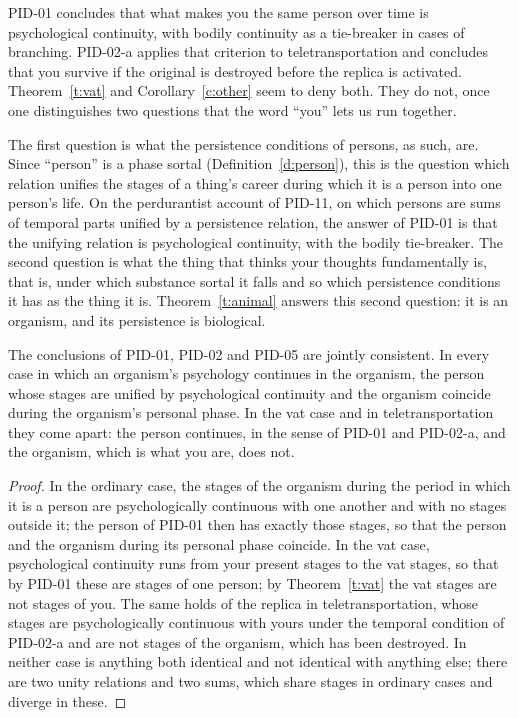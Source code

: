 \documentclass{situationist-preprint}
\begin{document}
PID-01 concludes that what makes you the same person over time is psychological continuity, with bodily continuity as a tie-breaker in cases of branching. PID-02-a applies that criterion to teletransportation and concludes that you survive if the original is destroyed before the replica is activated. Theorem~\ref{t:vat} and Corollary~\ref{c:other} seem to deny both. They do not, once one distinguishes two questions that the word \enquote{you} lets us run together.

The first question is what the persistence conditions of persons, as such, are. Since \enquote{person} is a phase sortal (Definition~\ref{d:person}), this is the question which relation unifies the stages of a thing's career during which it is a person into one person's life. On the perdurantist account of PID-11, on which persons are sums of temporal parts unified by a persistence relation, the answer of PID-01 is that the unifying relation is psychological continuity, with the bodily tie-breaker. The second question is what the thing that thinks your thoughts fundamentally is, that is, under which substance sortal it falls and so which persistence conditions it has as the thing it is. Theorem~\ref{t:animal} answers this second question: it is an organism, and its persistence is biological.

\begin{proposition}\label{p:recon}
The conclusions of PID-01, PID-02 and PID-05 are jointly consistent. In every case in which an organism's psychology continues in the organism, the person whose stages are unified by psychological continuity and the organism coincide during the organism's personal phase. In the vat case and in teletransportation they come apart: the person continues, in the sense of PID-01 and PID-02-a, and the organism, which is what you are, does not.
\end{proposition}

\begin{proof}
In the ordinary case, the stages of the organism during the period in which it is a person are psychologically continuous with one another and with no stages outside it; the person of PID-01 then has exactly those stages, so that the person and the organism during its personal phase coincide. In the vat case, psychological continuity runs from your present stages to the vat stages, so that by PID-01 these are stages of one person; by Theorem~\ref{t:vat} the vat stages are not stages of you. The same holds of the replica in teletransportation, whose stages are psychologically continuous with yours under the temporal condition of PID-02-a and are not stages of the organism, which has been destroyed. In neither case is anything both identical and not identical with anything else; there are two unity relations and two sums, which share stages in ordinary cases and diverge in these.
\end{proof}
\end{document}
